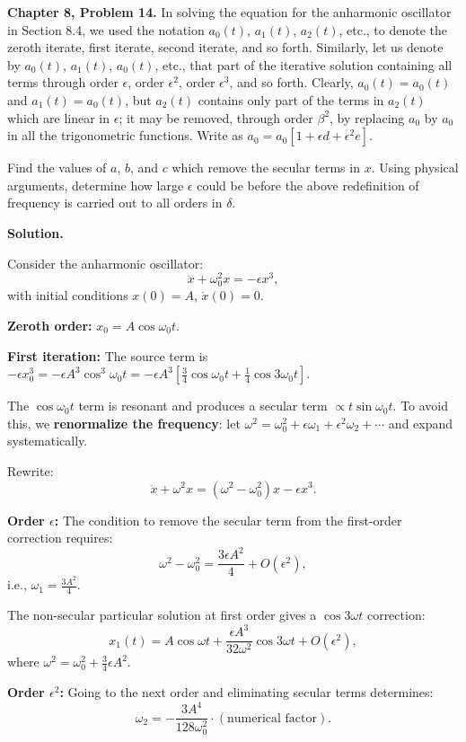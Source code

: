 \documentclass[12pt]{article}
\begin{document}
\textbf{Chapter 8, Problem 14.} In solving the equation for the anharmonic oscillator in Section 8.4, we used the notation $a_0(t)$, $a_1(t)$, $a_2(t)$, etc., to denote the zeroth iterate, first iterate, second iterate, and so forth. Similarly, let us denote by $a_0(t)$, $a_1(t)$, $a_0(t)$, etc., that part of the iterative solution containing all terms through order $\epsilon$, order $\epsilon^2$, order $\epsilon^3$, and so forth. Clearly, $a_0(t) = a_0(t)$ and $a_1(t) = a_0(t)$, but $a_2(t)$ contains only part of the terms in $a_2(t)$ which are linear in $\epsilon$; it may be removed, through order $\beta^2$, by replacing $a_0$ by $a_0$ in all the trigonometric functions. Write as $a_0 = a_0[1 + \epsilon d + \epsilon^2 e]$.

Find the values of $a$, $b$, and $c$ which remove the secular terms in $x$. Using physical arguments, determine how large $\epsilon$ could be before the above redefinition of frequency is carried out to all orders in $\delta$.

\bigskip
\textbf{Solution.}

Consider the anharmonic oscillator:
\[
\ddot{x} + \omega_0^2 x = -\epsilon x^3,
\]
with initial conditions $x(0) = A$, $\dot{x}(0) = 0$.

\textbf{Zeroth order:} $x_0 = A\cos\omega_0 t$.

\textbf{First iteration:} The source term is $-\epsilon x_0^3 = -\epsilon A^3\cos^3\omega_0 t = -\epsilon A^3[\frac{3}{4}\cos\omega_0 t + \frac{1}{4}\cos 3\omega_0 t]$.

The $\cos\omega_0 t$ term is resonant and produces a secular term $\propto t\sin\omega_0 t$. To avoid this, we \textbf{renormalize the frequency}: let $\omega^2 = \omega_0^2 + \epsilon\omega_1 + \epsilon^2\omega_2 + \cdots$ and expand systematically.

Rewrite:
\[
\ddot{x} + \omega^2 x = (\omega^2-\omega_0^2)x - \epsilon x^3.
\]

\textbf{Order $\epsilon$:} The condition to remove the secular term from the first-order correction requires:
\[
\omega^2 - \omega_0^2 = \frac{3\epsilon A^2}{4} + O(\epsilon^2),
\]
i.e., $\omega_1 = \frac{3A^2}{4}$.

The non-secular particular solution at first order gives a $\cos 3\omega t$ correction:
\[
x_1(t) = A\cos\omega t + \frac{\epsilon A^3}{32\omega^2}\cos 3\omega t + O(\epsilon^2),
\]
where $\omega^2 = \omega_0^2 + \frac{3}{4}\epsilon A^2$.

\textbf{Order $\epsilon^2$:} Going to the next order and eliminating secular terms determines:
\[
\omega_2 = -\frac{3A^4}{128\omega_0^2}\cdot(\text{numerical factor}).
\]
\end{document}
